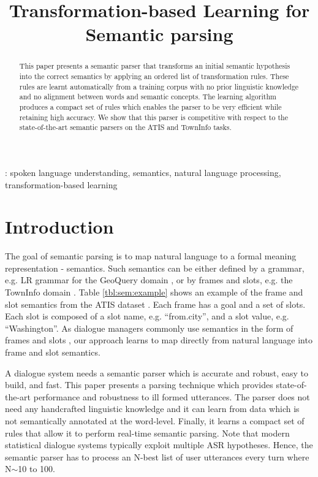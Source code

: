 \documentclass{article}
\title{Transformation-based Learning for Semantic parsing}
\begin{document}
\maketitle
%
\begin{abstract}
This paper presents a semantic parser that transforms an initial semantic hypothesis into the correct semantics by applying an ordered list of transformation rules. These rules are learnt automatically from a training corpus with no prior linguistic knowledge and no alignment between words and semantic concepts. The learning algorithm produces a compact set of rules which enables the parser to be very efficient while retaining high accuracy. We show that this parser is competitive with respect to the state-of-the-art semantic parsers on the ATIS and TownInfo tasks.
\end{abstract}
\vspace{0.1cm}
: spoken language understanding, semantics, natural language processing, transformation-based learning


\section{Introduction}
The goal of semantic parsing is to map natural language to a formal meaning representation - semantics. Such semantics can be either defined by a grammar, e.g. LR grammar for the GeoQuery domain \cite{kate05}, or by frames and slots, e.g. the TownInfo domain \cite{mairesse09}. Table \ref{tbl:sem:example} shows an example of the frame and slot semantics from the ATIS dataset \cite{atis94}. Each frame has a goal and a set of slots. Each slot is composed of a slot name, e.g. ``from.city'',
and a slot value, e.g. ``Washington''. As dialogue managers commonly use semantics in the form of frames and slots \cite{williams07,thomson08}, our approach learns to map directly from natural language into frame and slot semantics.


A dialogue system needs a semantic parser which is accurate and robust, easy to build, and fast. This paper presents a parsing technique which provides state-of-the-art performance and robustness to ill formed utterances. The parser does not need any handcrafted linguistic knowledge and it can learn from data which is not semantically annotated at the word-level. Finally, it learns a compact set of rules that allow it to perform real-time semantic parsing. Note that modern statistical dialogue systems typically exploit multiple ASR hypotheses. Hence, the semantic parser has to process an N-best list of user utterances every turn where N$\sim$10 to 100.
\end{document}
